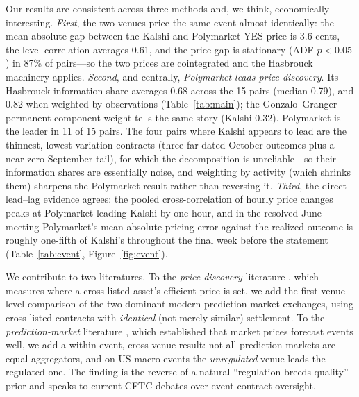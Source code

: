\documentclass[12pt]{article}
\begin{document}
Our results are consistent across three methods and, we think, economically interesting.
\emph{First}, the two venues price the same event almost identically: the mean absolute gap
between the Kalshi and Polymarket YES price is 3.6 cents, the level correlation averages
0.61, and the price gap is stationary (ADF $p<0.05$) in 87\% of pairs---so the two prices
are cointegrated and the Hasbrouck machinery applies. \emph{Second}, and centrally,
\emph{Polymarket leads price discovery}. Its Hasbrouck information share averages 0.68
across the 15 pairs (median 0.79), and 0.82 when weighted by observations
(Table~\ref{tab:main}); the Gonzalo--Granger permanent-component weight tells the same story
(Kalshi 0.32). Polymarket is the leader in 11 of 15 pairs. The four pairs where Kalshi
appears to lead are the thinnest, lowest-variation contracts (three far-dated October
outcomes plus a near-zero September tail), for which the decomposition is unreliable---so
their information shares are essentially noise, and weighting by activity (which shrinks
them) sharpens the Polymarket result rather than reversing it. \emph{Third}, the direct lead--lag evidence
agrees: the pooled cross-correlation of hourly price changes peaks at Polymarket leading
Kalshi by one hour, and in the resolved June meeting Polymarket's mean absolute pricing
error against the realized outcome is roughly one-fifth of Kalshi's throughout the final
week before the statement (Table~\ref{tab:event}, Figure~\ref{fig:event}).

We contribute to two literatures. To the \emph{price-discovery} literature
\citep{hasbrouck1995,gonzalo1995,baillie2002,putnins2013}, which measures where a
cross-listed asset's efficient price is set, we add the first venue-level comparison of the
two dominant modern prediction-market exchanges, using cross-listed contracts with
\emph{identical} (not merely similar) settlement. To the \emph{prediction-market}
literature \citep{wolfers2004,manski2006,snowberg2013,berg2008}, which established that
market prices forecast events well, we add a within-event, cross-venue result: not all
prediction markets are equal aggregators, and on US macro events the \emph{unregulated}
venue leads the regulated one. The finding is the reverse of a natural ``regulation breeds
quality'' prior and speaks to current CFTC debates over event-contract oversight.
\end{document}
